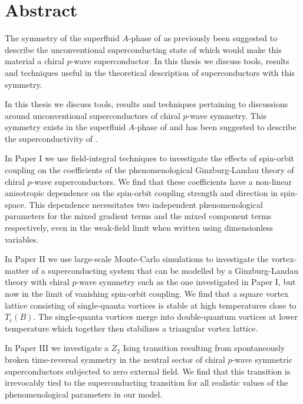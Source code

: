 \chapter*{Abstract}\noindent
%
The symmetry of the superfluid $A$-phase of  as previously been suggested to describe the unconventional superconducting state
of  which would make this material a chiral $p$-wave superconductor. In this thesis we discuss tools, results and 
techniques useful in the theoretical description of superconductors with this symmetry.

In this thesis we discuss tools, results and techniques pertaining to discussions around unconventional superconductors of chiral $p$-wave symmetry.
This symmetry exists in the superfluid $A$-phase of  and has been suggested to describe the superconductivity of .

In Paper I we use field-integral techniques to investigate the effects of spin-orbit coupling on the coefficients of the phenomenological
Ginzburg-Landau theory of chiral $p$-wave superconductors. We find that these coefficients have a non-linear anisotropic dependence on the
spin-orbit coupling strength and direction in spin-space. This dependence necessitates two independent phenomenological parameters for
the mixed gradient terms and the mixed component terms respectively, even in the weak-field limit when written using
dimensionless variables.

In Paper II we use large-scale Monte-Carlo simulations to investigate the vortex-matter of a superconducting system that can be modelled
by a Ginzburg-Landau theory with chiral $p$-wave symmetry such as the one investigated in Paper I, but now in the limit of vanishing
spin-orbit coupling. We find that a square vortex lattice consisting of single-quanta vortices is stable at high temperatures close to
$T_c(B)$. The single-quanta vortices merge into double-quantum vortices at lower temperature which together then stabilizes a triangular
vortex lattice.

In Paper III we investigate a $Z_2$ Ising transition resulting from spontaneously broken time-reversal symmetry in the neutral sector
of chiral $p$-wave symmetric superconductors subjected to zero external field. We find that this transition is irrevocably tied to
the superconducting transition for all realistic values of the phenomenological parameters in our model.

